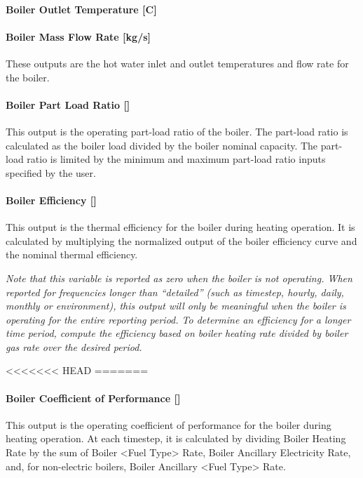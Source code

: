 \paragraph{Boiler Outlet Temperature {[}C{]}}\label{boiler-outlet-temperature-c}

\paragraph{Boiler Mass Flow Rate {[}kg/s{]}}\label{boiler-mass-flow-rate-kgs}

These outputs are the hot water inlet and outlet temperatures and flow rate for the boiler.

\paragraph{Boiler Part Load Ratio {[]}}\label{boiler-part-load-ratio}

This output is the operating part-load ratio of the boiler. The part-load ratio is calculated as the boiler load divided by the boiler nominal capacity. The part-load ratio is limited by the minimum and maximum part-load ratio inputs specified by the user.

\paragraph{Boiler Efficiency {[]}}\label{boiler-efficiency}

This output is the thermal efficiency for the boiler during heating operation. It is calculated by multiplying the normalized output of the boiler efficiency curve and the nominal thermal efficiency.

\emph{Note that this variable is reported as zero when the boiler is not operating. When reported for frequencies longer than ``detailed'' (such as timestep, hourly, daily, monthly or environment), this output will only be meaningful when the boiler is operating for the entire reporting period. To determine an efficiency for a longer time period, compute the efficiency based on boiler heating rate divided by boiler gas rate over the desired period.}

<<<<<<< HEAD
=======
\paragraph{Boiler Coefficient of Performance {[]}}\label{boiler-coefficient-of-performance}

This output is the operating coefficient of performance for the boiler during heating operation. At each timestep, it is calculated by dividing Boiler Heating Rate by the sum of Boiler \textless{}Fuel Type\textgreater{} Rate, Boiler Ancillary Electricity Rate, and, for non-electric boilers, Boiler Ancillary \textless{}Fuel Type\textgreater{} Rate.

